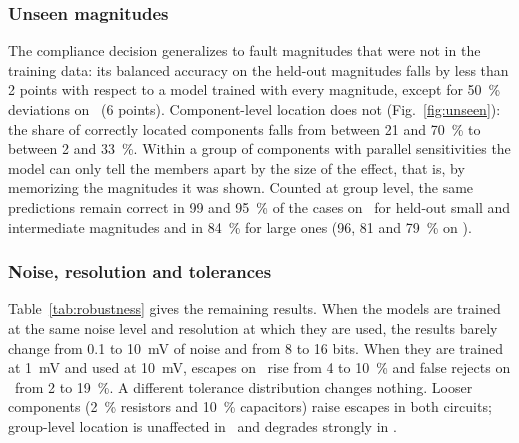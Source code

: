\subsubsection{Unseen magnitudes}
The compliance decision generalizes to fault magnitudes that were not in the training data: its
balanced accuracy on the held-out magnitudes falls by less than 2 points with respect to a model
trained with every magnitude, except for \SI{50}{\percent} deviations on \cA\ (6 points). Component-level location does not (Fig.~\ref{fig:unseen}): the
share of correctly located components falls from between 21 and \SI{70}{\percent} to between 2 and
\SI{33}{\percent}. Within a group of components with parallel sensitivities the model can only
tell the members apart by the size of the effect, that is, by memorizing the magnitudes it was
shown. Counted at group level, the same predictions remain correct in 99 and \SI{95}{\percent} of
the cases on \cA\ for held-out small and intermediate magnitudes and in \SI{84}{\percent} for
large ones (96, 81 and \SI{79}{\percent} on \cB).

\subsubsection{Noise, resolution and tolerances}
Table~\ref{tab:robustness} gives the remaining results. When the models are trained at the same
noise level and resolution at which they are used, the results barely change from 0.1 to
\SI{10}{\milli\volt} of noise and from 8 to 16 bits. When they are trained at
\SI{1}{\milli\volt} and used at \SI{10}{\milli\volt}, escapes on \cA\ rise from 4 to
\SI{10}{\percent} and false rejects on \cB\ from 2 to \SI{19}{\percent}. A different tolerance
distribution changes nothing. Looser components (\SI{2}{\percent} resistors and \SI{10}{\percent}
capacitors) raise escapes in both circuits; group-level location is unaffected in \cA\ and
degrades strongly in \cB.

